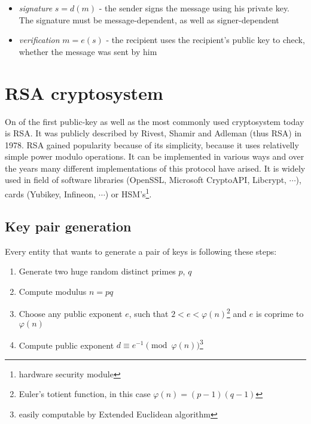 \begin{itemize}

\item \textit{signature} $s = d(m)$ - the sender signs the message using his private key. The signature must be message-dependent, as well as signer-dependent

\item \textit{verification} $m = e(s)$ - the recipient uses the recipient's public key to check, whether the message was sent by him

\end{itemize}

\section{RSA cryptosystem}

On of the first public-key as well as the most commonly used cryptosystem today is RSA. It was publicly described by Rivest, Shamir and Adleman (thus RSA) in 1978\cite{rsa_paper}. RSA gained popularity because of its simplicity, because it uses relativelly simple power modulo operations. It can be implemented in various ways and over the years many different implementations of this protocol have arised. It is widely used in field of software libraries (OpenSSL, Microsoft CryptoAPI, Libcrypt, $\cdots$), cards (Yubikey, Infineon, $\cdots$) or HSM's\footnote{hardware security module}.


\subsection*{Key pair generation}

Every entity that wants to generate a pair of keys is following these steps:

\begin{enumerate}

\item Generate two huge random distinct primes $p$, $q$
\item Compute modulus $n = pq$
\item Choose any public exponent $e$, such that $2 < e < \varphi(n)$\footnote{Euler's totient function, in this case $\varphi(n) = (p-1)(q-1)$} and $e$ is coprime to $\varphi(n)$
\item Compute public exponent $d \equiv e^{-1} \pmod{\varphi(n)}$\footnote{easily computable by Extended Euclidean algorithm}

\end{enumerate}

